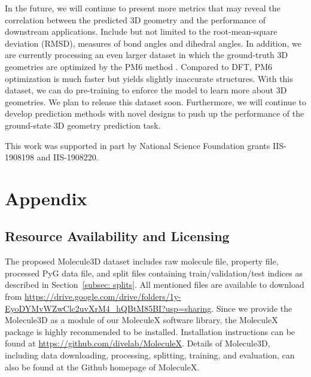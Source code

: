 \documentclass{article}
\begin{document}
In the future, we will continue to present more metrics that may reveal the correlation between the predicted 3D geometry and the performance of downstream applications. Include but not limited to the root-mean-square deviation (RMSD), measures of bond angles and dihedral angles. In addition, we are currently processing an even larger dataset in which the ground-truth 3D geometries are optimized by the PM6 method \cite{nakata2020pubchemqc}. Compared to DFT, PM6 optimization is much faster but yields slightly inaccurate structures. With this dataset, we can do pre-training to enforce the model to learn more about 3D geometries. We plan to release this dataset soon. Furthermore, we will continue to develop prediction methods with novel designs to push up the performance of the ground-state 3D geometry prediction task. 

\begin{ack}
This work was supported in part by National Science Foundation grants IIS-1908198 and IIS-1908220.

\end{ack}


































\newpage
\appendix

\section{Appendix}

\subsection{Resource Availability and Licensing}

The proposed Molecule3D dataset includes raw molecule file, property file, processed PyG data file, and split files containing train/validation/test indices as described in Section~\ref{subsec: splits}. All mentioned files are available to download from \url{https://drive.google.com/drive/folders/1y-EyoDYMvWZwClc2uvXrM4\_hQBtM85BI?usp=sharing}. Since we provide the Molecule3D as a module of our MoleculeX software library, the MoleculeX package is highly recommended to be installed. Installation instructions can be found at \url{https://github.com/divelab/MoleculeX}. Details of Molecule3D, including data downloading, processing, splitting, training, and evaluation, can also be found at the Github homepage of MoleculeX. 
\end{document}
